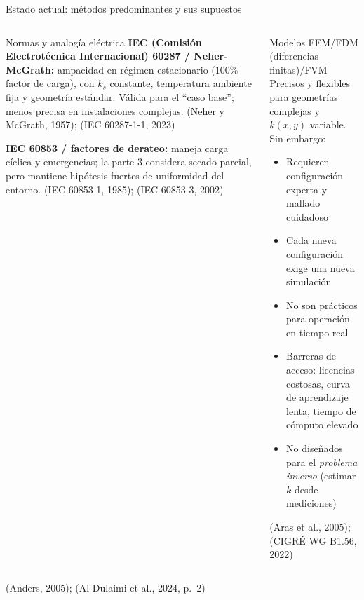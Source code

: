 \documentclass[aspectratio=169]{beamer}
\newcommand{\refcite}[1]{{\footnotesize\color{gray!70!black} #1}}
\begin{document}
\begin{frame}{Estado actual: métodos predominantes y sus supuestos}
\begin{columns}[T]
\begin{alertblock}{Normas y analogía eléctrica}
\scriptsize\justifying
\textbf{IEC (Comisión Electrotécnica Internacional) 60287 / Neher-McGrath:} ampacidad en régimen
estacionario (100\% factor de carga), con $k_s$ constante, temperatura
ambiente fija y geometría estándar. Válida para el ``caso base''; menos
precisa en instalaciones complejas.
\refcite{(Neher y McGrath, 1957); (IEC 60287-1-1, 2023)}

\vspace{0.2em}
\textbf{IEC 60853 / factores de derateo:} maneja carga cíclica y
emergencias; la parte 3 considera secado parcial, pero mantiene hipótesis
fuertes de uniformidad del entorno.
\refcite{(IEC 60853-1, 1985); (IEC 60853-3, 2002)}
\end{alertblock}

\begin{alertblock}{Modelos FEM/FDM (diferencias finitas)/FVM}
\scriptsize\justifying
Precisos y flexibles para geometrías complejas y $k(x,y)$ variable. Sin
embargo:
\begin{itemize}[leftmargin=*,itemsep=1pt]
    \item Requieren configuración experta y mallado cuidadoso
    \item Cada nueva configuración exige una nueva simulación
    \item No son prácticos para operación en tiempo real
    \item Barreras de acceso: licencias costosas, curva de aprendizaje
          lenta, tiempo de cómputo elevado
    \item No diseñados para el \textit{problema inverso} (estimar
          $k$ desde mediciones)
\end{itemize}
\refcite{(Aras et al., 2005); (CIGRÉ WG B1.56, 2022)}
\end{alertblock}
\end{columns}

\vspace{0.2em}
\refcite{(Anders, 2005); (Al-Dulaimi et al., 2024, p.~2)}
\end{frame}
\end{document}
